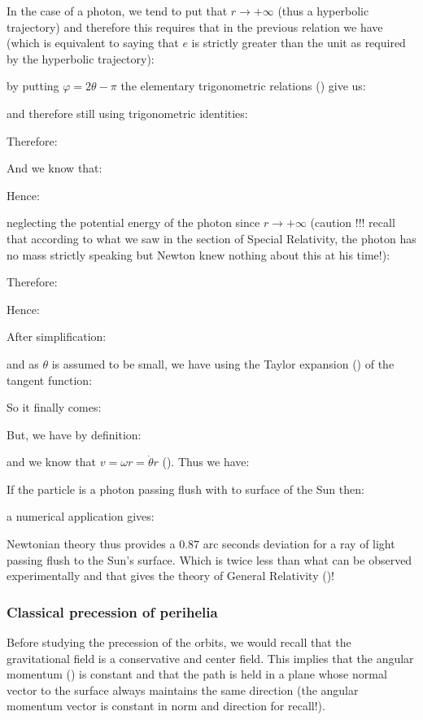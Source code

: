 	In the case of a photon, we tend to put that $r\rightarrow +\infty$ (thus a hyperbolic trajectory) and therefore this requires that in the previous relation we have (which is equivalent to saying that $e$ is strictly greater than the unit as required by the hyperbolic trajectory):
	
	by putting $\varphi=2\theta-\pi$ the elementary trigonometric relations () give us:
	
	and therefore still using trigonometric identities:
	
	Therefore:
	
	And we know that:
	
	Hence:
	
	neglecting the potential energy of the photon since $r\rightarrow +\infty$ (caution !!! recall that according to what we saw in the section of Special Relativity, the photon has no mass strictly speaking but Newton knew nothing about this at his time!):
	
	Therefore:
	
	Hence:
	
	After simplification:
	
	and as $\theta$ is assumed to be small, we have using the Taylor expansion () of the tangent function:
	
	So it finally comes:
	
	But, we have by definition:
	
	and we know that $v=\omega r=\dot{\theta}r$ (). Thus we have:
	
	If the particle is a photon passing flush with to surface of the Sun then:
	
	a numerical application gives:
	
	Newtonian theory thus provides a $0.87$ arc seconds deviation for a ray of light passing flush to the Sun's surface. Which is twice less than what can be observed experimentally and that gives the theory of General Relativity ()!
	
	\subsubsection{Classical precession of perihelia}
	Before studying the precession of the orbits, we would recall that the gravitational field is a conservative and center field. This implies that the angular momentum () is constant and that the path is held in a plane whose normal vector to the surface always maintains the same direction (the angular momentum vector is constant in norm and direction for recall!).

